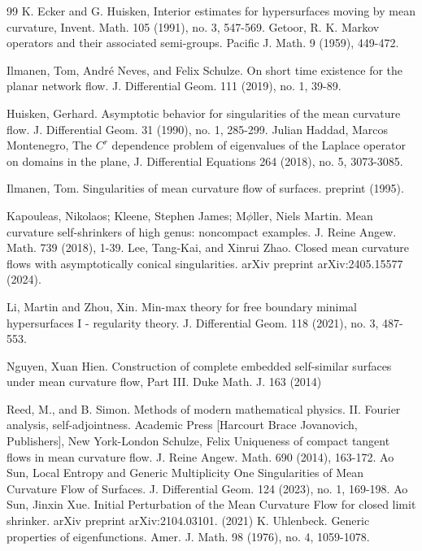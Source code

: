 \documentclass[12pt]{amsart}
\numberwithin{equation}{section}
\numberwithin{equation}{section}
\begin{document}
\begin{thebibliography}{99}
		 K. Ecker and G. Huisken, {Interior estimates for hypersurfaces moving by mean curvature}, Invent. Math. 105 (1991), no. 3, 547-569.
		 Getoor, R. K. {Markov operators and their associated semi-groups.} Pacific J. Math. 9 (1959), 449-472.
		
		 Ilmanen, Tom, Andr\'e Neves, and Felix Schulze. {On short time existence for the planar network flow.} J. Differential Geom. 111 (2019), no. 1, 39-89.
		
		 Huisken, Gerhard. {Asymptotic behavior for singularities of the mean curvature flow.} J. Differential Geom. 31 (1990), no. 1, 285-299.
		 Julian Haddad, Marcos Montenegro, {The $C^r$ dependence problem of eigenvalues of the Laplace operator on domains in the plane}, 
		J. Differential Equations 264 (2018), no. 5, 3073-3085.
		
		 Ilmanen, Tom. {Singularities of mean curvature flow of surfaces.} preprint (1995).
		
		
		 Kapouleas, Nikolaos; Kleene, Stephen James; M$\phi$ller, Niels Martin. {Mean curvature self-shrinkers of high genus: noncompact examples.} J. Reine Angew. Math. 739 (2018), 1-39.
		 Lee, Tang-Kai, and Xinrui Zhao. {Closed mean curvature flows with asymptotically conical singularities.} arXiv preprint arXiv:2405.15577 (2024).
		
		
		 Li, Martin and Zhou, Xin. {Min-max theory for free boundary minimal hypersurfaces I - regularity theory.} 
		J. Differential Geom. 118 (2021), no. 3, 487-553.
		
		 Nguyen, Xuan Hien. {Construction of complete embedded self-similar surfaces under mean curvature flow, Part III.} Duke Math. J. 163 (2014)
		
		 Reed, M., and B. Simon. {Methods of modern mathematical physics. II. Fourier analysis, self-adjointness.} Academic Press [Harcourt Brace Jovanovich, Publishers], New York-London
		 Schulze, Felix {Uniqueness of compact tangent flows in mean curvature flow. }J. Reine Angew. Math. 690 (2014), 163-172.
		 Ao Sun, {Local Entropy and Generic Multiplicity One Singularities of Mean Curvature Flow of Surfaces.} 
		J. Differential Geom. 124 (2023), no. 1, 169-198.
		 Ao Sun, Jinxin Xue. {Initial Perturbation of the Mean Curvature Flow for closed limit shrinker. arXiv preprint arXiv:2104.03101. (2021)} 
		 K. Uhlenbeck. {Generic properties of eigenfunctions.} 
		Amer. J. Math. 98 (1976), no. 4, 1059-1078.
		

\end{thebibliography}
\end{document}
